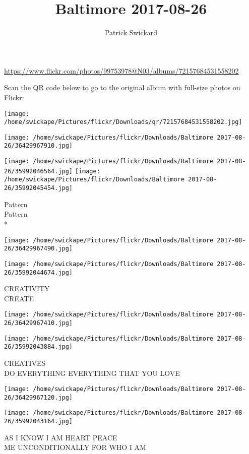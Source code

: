 \documentclass[10pt,letterpaper]{article}
\title{Baltimore 2017-08-26}
\author{Patrick Swickard}
\date{}
\begin{document}
\maketitle

\url{https://www.flickr.com/photos/99753978@N03/albums/72157684531558202}

Scan the QR code below to go to the original album with full-size photos on Flickr:

\texttt{[image: /home/swickape/Pictures/flickr/Downloads/qr/72157684531558202.jpg]}
\pagebreak

\texttt{[image: /home/swickape/Pictures/flickr/Downloads/Baltimore 2017-08-26/36429967910.jpg]}

\vspace{0.25in}
\texttt{[image: /home/swickape/Pictures/flickr/Downloads/Baltimore 2017-08-26/35992046564.jpg]}
\texttt{[image: /home/swickape/Pictures/flickr/Downloads/Baltimore 2017-08-26/35992045454.jpg]}

Pattern\\
Pattern\\
*
\pagebreak

\texttt{[image: /home/swickape/Pictures/flickr/Downloads/Baltimore 2017-08-26/36429967490.jpg]}

\vspace{0.25in}
\texttt{[image: /home/swickape/Pictures/flickr/Downloads/Baltimore 2017-08-26/35992044674.jpg]}

CREATIVITY\\
CREATE
\pagebreak

\texttt{[image: /home/swickape/Pictures/flickr/Downloads/Baltimore 2017-08-26/36429967410.jpg]}

\vspace{0.25in}
\texttt{[image: /home/swickape/Pictures/flickr/Downloads/Baltimore 2017-08-26/35992043884.jpg]}

CREATIVES\\
DO EVERYTHING EVERYTHING THAT YOU LOVE
\pagebreak

\texttt{[image: /home/swickape/Pictures/flickr/Downloads/Baltimore 2017-08-26/36429967120.jpg]}

\vspace{0.25in}
\texttt{[image: /home/swickape/Pictures/flickr/Downloads/Baltimore 2017-08-26/35992043164.jpg]}

AS I KNOW I AM HEART PEACE\\
ME UNCONDITIONALLY FOR WHO I AM
\pagebreak
\end{document}
